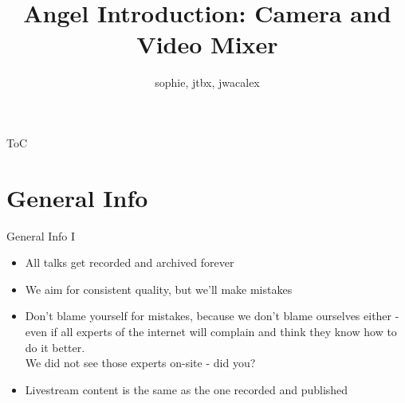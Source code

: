 \documentclass[aspectratio=169]{beamer}
\title{Angel Introduction: Camera and Video Mixer}
\author{sophie, jtbx, jwacalex}
\institute{C3VOC@GPN21}
\begin{document}

\maketitle

\begin{frame}{ToC}
\tableofcontents
\end{frame}


\newpage





\section{General Info}
\begin{frame}{General Info I}
	\begin{itemize}
		\item All talks get recorded and archived forever
		\item We aim for consistent quality, but we'll make mistakes
		\item Don't blame yourself for mistakes, because we don't blame ourselves either - even if all experts of the internet will complain and think they know how to do it better. \\ We did not see those experts on-site - did you?
		\item Livestream content is the same as the one recorded and published
	\end{itemize}
\end{frame}
\end{document}
